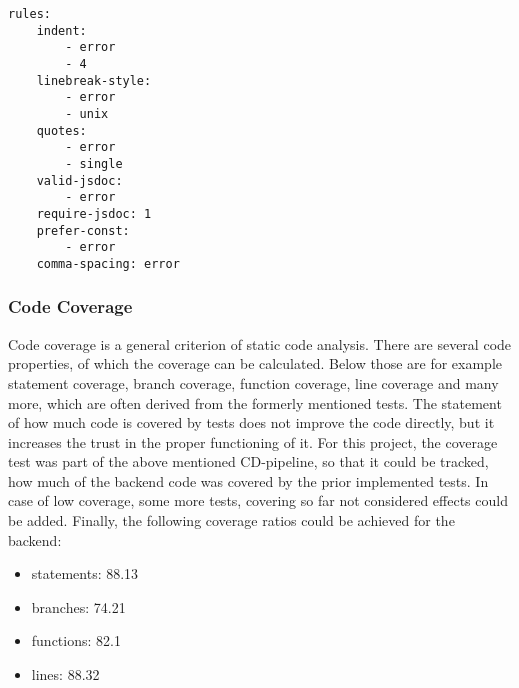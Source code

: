 \begin{lstlisting}[caption={Extract from the rules of the \textit{Lint} configuration file.}, label=lst:lintrules]
rules:
	indent:
		- error
		- 4
	linebreak-style:
		- error
		- unix
	quotes:
		- error
		- single
	valid-jsdoc:
		- error
	require-jsdoc: 1
	prefer-const:
		- error
	comma-spacing: error
\end{lstlisting}

\subsubsection{Code Coverage}
\label{subsubsec:codecoverage}
Code coverage is a general criterion of static code analysis. There are several code properties, of which the coverage can be calculated. Below those are for example statement coverage, branch coverage, function coverage, line coverage and many more, which are often derived from the formerly mentioned tests. The statement of how much code is covered by tests does not improve the code directly, but it increases the trust in the proper functioning of it. 
\newline\newline
For this project, the coverage test was part of the above mentioned CD-pipeline, so that it could be tracked, how much of the backend code was covered by the prior implemented tests. In case of low coverage, some more tests, covering so far not considered effects could be added. Finally, the following coverage ratios could be achieved for the backend:
\begin{itemize}
	\item statements: 88.13%
	\item branches: 74.21%
	\item functions: 82.1%
	\item lines: 88.32%
\end{itemize} 

